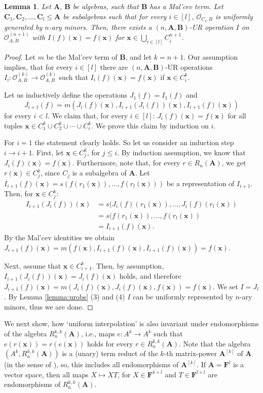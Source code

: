 \documentclass[11pt]{amsart}
\theoremstyle{plain}
\newtheorem{lemma}[thm]{Lemma}
\theoremstyle{definition}
\newcommand{\F}{{\mathbf F}}
\newcommand{\alg}[1]{\mathbf{#1}}
\newcommand{\clonoid}[1]{\mathcal{#1}}
\newcommand{\clodO}{\clonoid{O}}
\newcommand{\algA}{\alg{A}}
\newcommand{\algB}{\alg{B}}
\newcommand{\algC}{\alg{C}}
\renewcommand\vec{\mathbf}
\newcommand{\vx}{\vec{x}}
\begin{document}
\begin{lemma} \label{lemma:ugsubalgebras}
Let $\algA$, $\algB$ be algebras, such that $\algB$ has a Mal'cev term. Let $\algC_1,\algC_2,\ldots,\algC_l \leq \algA$ be subalgebras such that for every $i \in [l]$, $\clodO_{C_i,B}$ is uniformly generated by $n$-ary minors. Then, there exists a $(n,\algA,\algB)$-UR operation $I$ on $\clodO_{A,B}^{(n+1)}$ with $I(f)(\mathbf x) = f(\mathbf x)$ for $\mathbf x\in \bigcup_{i \in [l]} C_i^{n+1}$.
\end{lemma}

\begin{proof}
Let $m$ be the Mal'cev term of $\algB$, and let $k = n+1$. Our assumption implies, that for every $i \in [l]$ there are $(n,\algA,\algB)$-UR operations $I_i\colon \clodO_{A,B}^{(k)} \to \clodO_{A,B}^{(k)}$ such that $I_i(f)(\vx) = f(\vx)$ if $\vx \in C_i^{k}$. 

Let us inductively define the operations $J_1(f) = I_1(f)$ and $$J_{i+1}(f) = m(J_i(f)(\vx),I_{i+1}(J_i(f))(\vx),I_{i+1}(f)(\vx))$$ for every $i < l$. We claim that, for every $i\in [l]$: $J_i(f)(\vx) = f(\vx)$ for all tuples $\vx \in C_1^k\cup  C_2^k \cup \cdots \cup  C_i^k$. We prove this claim by induction on $i$.

For $i=1$ the statement clearly holds. So let us consider an induction step $i \to i+1$. First, let $\vx \in C_j^k$, for $j \leq i$. By induction assumption, we know that $J_i(f)(\vx) = f(\vx)$. Furthermore, note that, for every $r \in R_n(\algA)$, we get $r(\vx) \in C_j^k$, since $C_j$ is a subalgebra of $\algA$. Let $I_{i+1}(f)(\vx) = s(f(r_1(\vx)),\ldots,f(r_l(\vx)))$ be a representation of $I_{i+1}$. Then, for $\vx \in C_j^k$:
\begin{align*}
I_{i+1}(J_i(f))(\vx) &=  s(J_i(f)(r_1(\vx)),\ldots,J_i(f)(r_l(\vx))\\
&=  s(f(r_1(\vx)),\ldots,f(r_l(\vx)) \\
&= I_{i+1}(f)(\vx).
\end{align*}
By the Mal'cev identities we obtain $J_{i+1}(f)(\vx) = m(f(\vx),I_{i+1}(f)(\vx),I_{i+1}(f)(\vx)) = f(\vx)$.

Next, assume that $\vx \in C_{i+1}^k$. Then, by assumption, $I_{i+1}(J_i(f))(\vx) = J_i(f)(\vx)$ holds, and therefore  $J_{i+1}(f)(\vx) = m(J_i(f)(\vx),J_i(f)(\vx),f(\vx)) = f(\vx)$. We set $I = J_l$. By Lemma \ref{lemma:urobs} (3) and (4) $I$ can be uniformly represented by $n$-ary minors, thus we are done.
\end{proof}

We next show, how `uniform interpolation' is also invariant under endomorphisms of the algebra $R_n^{k,k}(\algA)$, i.e., maps $e \colon A^k \to A^k$ such that $e(r(\vx)) = r(e(\vx))$ holds for every $r \in R_n^{k,k}(\algA)$. Note that the algebra $(A^k, R_n^{k,k}(\algA))$ is a (unary) term reduct of the $k$-th matrix-power $\algA^{[k]}$ of $\algA$ (in the sense of \cite[Exercise 3.12 (4)]{HM-TCT}), so, this includes all endomorphisms of $\algA^{[k]}$. If $\algA = \F^l$ is a vector space, then all maps $X \mapsto XT$, for $X \in \F^{k\times l}$ and $T \in \F^{l\times l}$ are endomorphisms of $R_n^{k,k}(\algA)$.
\end{document}
